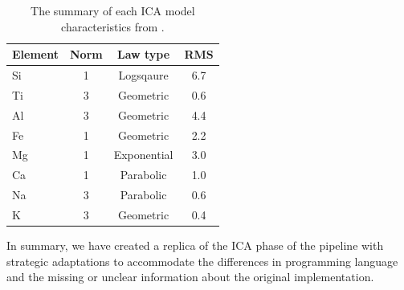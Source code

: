 \begin{table}[h]
\centering
\begin{tabular*}{\columnwidth}{@{\extracolsep{\fill}}lccc}
\toprule
Element & Norm & Law type    & RMS \\ \midrule
Si      & 1    & Logsqaure   & 6.7 \\
Ti      & 3    & Geometric   & 0.6 \\
Al      & 3    & Geometric   & 4.4 \\
Fe      & 1    & Geometric   & 2.2 \\
Mg      & 1    & Exponential & 3.0 \\
Ca      & 1    & Parabolic   & 1.0 \\
Na      & 3    & Parabolic   & 0.6 \\
K       & 3    & Geometric   & 0.4 \\
\bottomrule
\end{tabular*}
\caption{The summary of each ICA model characteristics from \citeauthor{cleggRecalibrationMarsScience2017}.}
\label{tab:regression_types}
\end{table}



In summary, we have created a replica of the ICA phase of the pipeline with strategic adaptations to accommodate the differences in programming language and the missing or unclear information about the original implementation.

